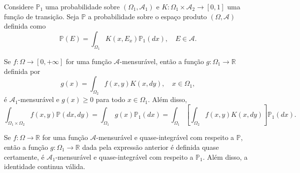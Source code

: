 \begin{theorem}
	Considere $\mathbb{P}_1$ uma probabilidade sobre $(\Omega_1, \mathcal{A}_1)$ e $K : \Omega_1 \times \mathcal{A}_2 \rightarrow [0, 1]$ uma função de transição. Seja $\mathbb{P}$ a probabilidade sobre o espaço produto $(\Omega, \mathcal{A})$ definida como
	\begin{equation}
		\mathbb{P}(E) = \int_{\Omega_1} K(x, E_x)\mathbb{P}_1(dx), \quad E \in \mathcal{A}.
	\end{equation}
	
	\begin{outline}
		\1[(a)] Se $f : \Omega \rightarrow [0, +\infty]$ for uma função $\mathcal{A}$-mensurável, então a função $g : \Omega_1 \rightarrow \mathbb{R}$ definida por
		\begin{equation}
			g(x) = \int_{\Omega_2} f(x, y)K(x, dy), \quad x \in \Omega_1,
		\end{equation}
		é $\mathcal{A}_1$-mensurável e $g(x) \geq 0$ para todo $x \in \Omega_1$. Além disso,
		\begin{equation}
			\int_{\Omega_1 \times \Omega_2} f(x, y) \mathbb{P}(dx, dy) = \int_{\Omega_1} g(x) \mathbb{P}_1(dx) = \int_{\Omega_1} \left[\int_{\Omega_2} f(x, y)K(x, dy)\right] \mathbb{P}_1(dx).
		\end{equation}
		
		\1[(b)] Se $f : \Omega \rightarrow \mathbb{R}$ for uma função $\mathcal{A}$-mensurável e quase-integrável com respeito a $\mathbb{P}$, então a função $g : \Omega_1 \rightarrow \mathbb{R}$ dada pela expressão anterior é definida quase certamente, é $\mathcal{A}_1$-mensurável e quase-integrável com respeito a $\mathbb{P}_1$. Além disso, a identidade continua válida.
	\end{outline}
\end{theorem}

